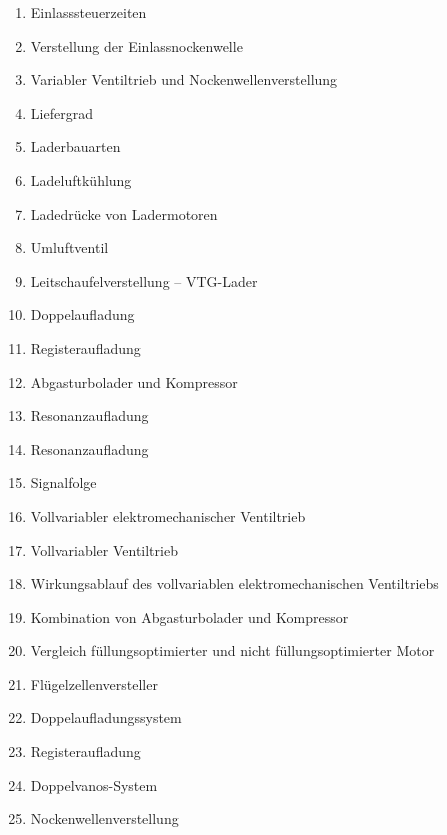\begin{enumerate}
\item
  Einlasssteuerzeiten\\
\item
  Verstellung der Einlassnockenwelle\\
\item
  Variabler Ventiltrieb und Nockenwellenverstellung\\
\item
  Liefergrad\\
\item
  Laderbauarten\\
\item
  Ladeluftkühlung\\
\item
  Ladedrücke von Ladermotoren\\
\item
  Umluftventil\\
\item
  Leitschaufelverstellung -- VTG-Lader\\
\item
  Doppelaufladung\\
\item
  Registeraufladung\\
\item
  Abgasturbolader und Kompressor\\
\item
  Resonanzaufladung\\
\item
  Resonanzaufladung\\
\item
  Signalfolge\\
\item
  Vollvariabler elektromechanischer Ventiltrieb\\
\item
  Vollvariabler Ventiltrieb\\
\item
  Wirkungsablauf des vollvariablen elektromechanischen Ventiltriebs\\
\item
  Kombination von Abgasturbolader und Kompressor\\
\item
  Vergleich füllungsoptimierter und nicht füllungsoptimierter Motor\\
\item
  Flügelzellenversteller\\
\item
  Doppelaufladungssystem\\
\item
  Registeraufladung\\
\item
  Doppelvanos-System\\
\item
  Nockenwellenverstellung
\end{enumerate}

